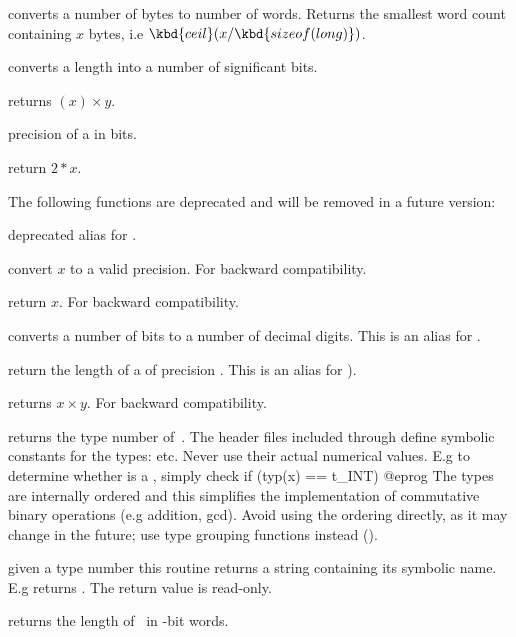  converts a number of bytes to number of
words. Returns the smallest word count containing $x$ bytes, i.e
$\kbd{ceil}(x / \kbd{sizeof(long)})$.

 converts a length into a number
of significant bits.

 returns
$(x)\times y$.

 precision of a  in bits.

 return $2*x$.

The following functions are deprecated and will be removed in a future
version:

 deprecated alias for .

 convert $x$ to a valid precision. For
backward compatibility.

 return $x$. For backward compatibility.

 converts a number of bits to a
number of decimal digits. This is an alias for .

 return the length of a  of precision
. This is an alias for ).

 returns
$x\times y$. For backward compatibility.



 returns the type number of~. The header files
included through  define symbolic constants for the 
types:  etc. Never use their actual numerical values. E.g to determine
whether  is a , simply check
\bprog
  if (typ(x) == t_INT) { }
@eprog\noindent
The types are internally ordered and this simplifies the implementation of
commutative binary operations (e.g addition, gcd). Avoid using the ordering
directly, as it may change in the future; use type grouping functions
instead ().

 given a type number  this routine
returns a string containing its symbolic name. E.g 
returns . The return value is read-only.

 returns the length of~ in \B-bit words.

